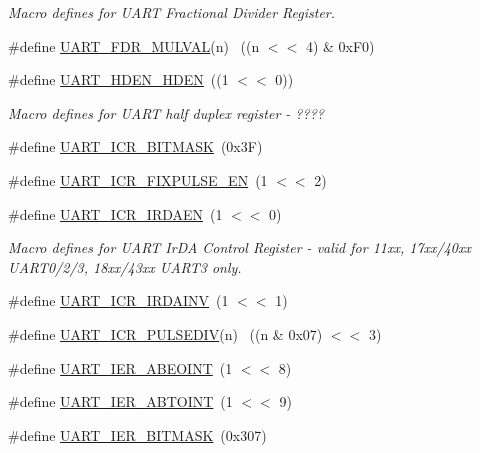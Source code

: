 \begin{DoxyCompactItemize}
\begin{DoxyCompactList}\small\item\em Macro defines for U\+A\+RT Fractional Divider Register. \end{DoxyCompactList}\item 
\#define \hyperlink{group__UART__17XX__40XX_ga3461adc8efd72186d4899b793d6919a3}{U\+A\+R\+T\+\_\+\+F\+D\+R\+\_\+\+M\+U\+L\+V\+AL}(n)        ~((n $<$$<$ 4) \& 0x\+F0)
\item 
\#define \hyperlink{group__UART__17XX__40XX_ga3affaa6bd622295bd6ea0c9f4a70b19c}{U\+A\+R\+T\+\_\+\+H\+D\+E\+N\+\_\+\+H\+D\+EN}~((1 $<$$<$ 0))
\begin{DoxyCompactList}\small\item\em Macro defines for U\+A\+RT half duplex register -\/ ???? \end{DoxyCompactList}\item 
\#define \hyperlink{group__UART__17XX__40XX_ga822d618fad4a8a146fd8113f827b5d09}{U\+A\+R\+T\+\_\+\+I\+C\+R\+\_\+\+B\+I\+T\+M\+A\+SK}~(0x3\+F)
\item 
\#define \hyperlink{group__UART__17XX__40XX_gae022dc3e5ad94f95d2805294d97594cd}{U\+A\+R\+T\+\_\+\+I\+C\+R\+\_\+\+F\+I\+X\+P\+U\+L\+S\+E\+\_\+\+EN}~(1 $<$$<$ 2)
\item 
\#define \hyperlink{group__UART__17XX__40XX_ga716e4830450b44e4f290e6c99879ba99}{U\+A\+R\+T\+\_\+\+I\+C\+R\+\_\+\+I\+R\+D\+A\+EN}~(1 $<$$<$ 0)
\begin{DoxyCompactList}\small\item\em Macro defines for U\+A\+RT Ir\+DA Control Register -\/ valid for 11xx, 17xx/40xx U\+A\+R\+T0/2/3, 18xx/43xx U\+A\+R\+T3 only. \end{DoxyCompactList}\item 
\#define \hyperlink{group__UART__17XX__40XX_gabee5ba619dd3c8f28a7d2ec488614f06}{U\+A\+R\+T\+\_\+\+I\+C\+R\+\_\+\+I\+R\+D\+A\+I\+NV}~(1 $<$$<$ 1)
\item 
\#define \hyperlink{group__UART__17XX__40XX_ga53fba58dcec65ff9cddb35c68b803a07}{U\+A\+R\+T\+\_\+\+I\+C\+R\+\_\+\+P\+U\+L\+S\+E\+D\+IV}(n)    ~((n \& 0x07) $<$$<$ 3)
\item 
\#define \hyperlink{group__UART__17XX__40XX_gaab2fcb3a77f3c010d56fccebf59b4cb1}{U\+A\+R\+T\+\_\+\+I\+E\+R\+\_\+\+A\+B\+E\+O\+I\+NT}~(1 $<$$<$ 8)
\item 
\#define \hyperlink{group__UART__17XX__40XX_ga5ddbca0802fdc260ac7966455d53761b}{U\+A\+R\+T\+\_\+\+I\+E\+R\+\_\+\+A\+B\+T\+O\+I\+NT}~(1 $<$$<$ 9)
\item 
\#define \hyperlink{group__UART__17XX__40XX_ga101e57e41855d1262e9d9b747854542f}{U\+A\+R\+T\+\_\+\+I\+E\+R\+\_\+\+B\+I\+T\+M\+A\+SK}~(0x307)

\end{DoxyCompactItemize}
